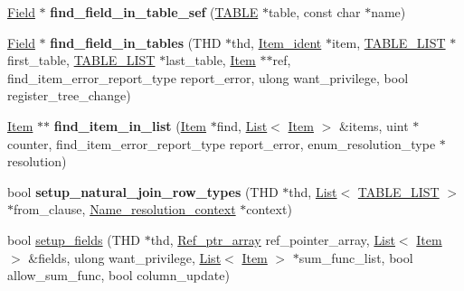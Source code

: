 \begin{DoxyCompactItemize}
\mbox{\hyperlink{classField}{Field}} $\ast$ {\bfseries find\+\_\+field\+\_\+in\+\_\+table\+\_\+sef} (\mbox{\hyperlink{structTABLE}{T\+A\+B\+LE}} $\ast$table, const char $\ast$name)
\item 
\mbox{\label{group__Data__Dictionary_ga40da7d22bc6c9c596a10e723d1dd5b71}} 
\mbox{\hyperlink{classField}{Field}} $\ast$ {\bfseries find\+\_\+field\+\_\+in\+\_\+tables} (T\+HD $\ast$thd, \mbox{\hyperlink{classItem__ident}{Item\+\_\+ident}} $\ast$item, \mbox{\hyperlink{structTABLE__LIST}{T\+A\+B\+L\+E\+\_\+\+L\+I\+ST}} $\ast$first\+\_\+table, \mbox{\hyperlink{structTABLE__LIST}{T\+A\+B\+L\+E\+\_\+\+L\+I\+ST}} $\ast$last\+\_\+table, \mbox{\hyperlink{classItem}{Item}} $\ast$$\ast$ref, find\+\_\+item\+\_\+error\+\_\+report\+\_\+type report\+\_\+error, ulong want\+\_\+privilege, bool register\+\_\+tree\+\_\+change)
\item 
\mbox{\label{group__Data__Dictionary_gad8a568dc8a852240a792309974498e53}} 
\mbox{\hyperlink{classItem}{Item}} $\ast$$\ast$ {\bfseries find\+\_\+item\+\_\+in\+\_\+list} (\mbox{\hyperlink{classItem}{Item}} $\ast$find, \mbox{\hyperlink{classList}{List}}$<$ \mbox{\hyperlink{classItem}{Item}} $>$ \&items, uint $\ast$counter, find\+\_\+item\+\_\+error\+\_\+report\+\_\+type report\+\_\+error, enum\+\_\+resolution\+\_\+type $\ast$resolution)
\item 
\mbox{\label{group__Data__Dictionary_gaecb35e53c52e10034b0479c304fbf206}} 
bool {\bfseries setup\+\_\+natural\+\_\+join\+\_\+row\+\_\+types} (T\+HD $\ast$thd, \mbox{\hyperlink{classList}{List}}$<$ \mbox{\hyperlink{structTABLE__LIST}{T\+A\+B\+L\+E\+\_\+\+L\+I\+ST}} $>$ $\ast$from\+\_\+clause, \mbox{\hyperlink{structName__resolution__context}{Name\+\_\+resolution\+\_\+context}} $\ast$context)
\item 
bool \mbox{\hyperlink{group__Data__Dictionary_gaa6d4287d0d00fc5733a67df33a193738}{setup\+\_\+fields}} (T\+HD $\ast$thd, \mbox{\hyperlink{classBounds__checked__array}{Ref\+\_\+ptr\+\_\+array}} ref\+\_\+pointer\+\_\+array, \mbox{\hyperlink{classList}{List}}$<$ \mbox{\hyperlink{classItem}{Item}} $>$ \&fields, ulong want\+\_\+privilege, \mbox{\hyperlink{classList}{List}}$<$ \mbox{\hyperlink{classItem}{Item}} $>$ $\ast$sum\+\_\+func\+\_\+list, bool allow\+\_\+sum\+\_\+func, bool column\+\_\+update)
\item 
\mbox{\label{group__Data__Dictionary_ga3ed6f7a411697a21f8e57aee4e40dcc9}} 

\end{DoxyCompactItemize}
